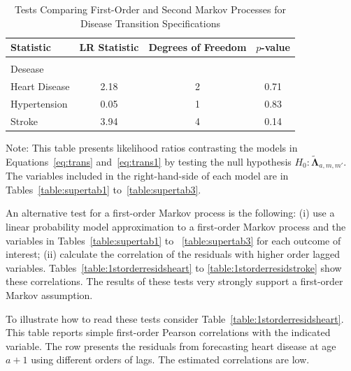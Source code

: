 \begin{table}[H]
\begin{threeparttable}
\caption{Tests Comparing First-Order and Second Markov Processes for Disease Transition Specifications} \label{table:lrtests}
\centering
\footnotesize
\begin{tabular}{lccc}
\toprule
Statistic & LR Statistic & Degrees of Freedom & $p$-value \\
\midrule \\
Desease & \\
Heart Disease & 2.18 & 2 & 0.71 \\
Hypertension   & 0.05 & 1 & 0.83 \\
Stroke              & 3.94 & 4 & 0.14 \\
\bottomrule
\end{tabular}
\begin{tablenotes}
\footnotesize
\item Note: This table presents likelihood ratios contrasting the models in Equations~\ref{eq:trans} and~\eqref{eq:trans1} by testing the null hypothesis $H_0: \tilde{\bm{\Lambda}}_{a,m,m'}$. The variables included in the right-hand-side of each model are in Tables~\ref{table:supertab1} to~\ref{table:supertab3}. 
\end{tablenotes}
\end{threeparttable}
\end{table}

\noindent An alternative test for a first-order Markov process is the following: (i) use a linear probability model approximation to a first-order Markov process and the variables in Tables~\ref{table:supertab1} to ~\ref{table:supertab3} for each outcome of interest; (ii) calculate the correlation of the residuals with higher order lagged variables. Tables~\ref{table:1storderresidsheart} to \ref{table:1storderresidstroke} show these correlations. The results of these tests very strongly support a first-order Markov assumption.

\noindent To illustrate how to read these tests consider Table~\ref{table:1storderresidsheart}. This table reports simple first-order Pearson correlations with the indicated variable. The row presents the residuals from forecasting heart disease at age $a+1$ using different orders of lags. The estimated correlations are low.

